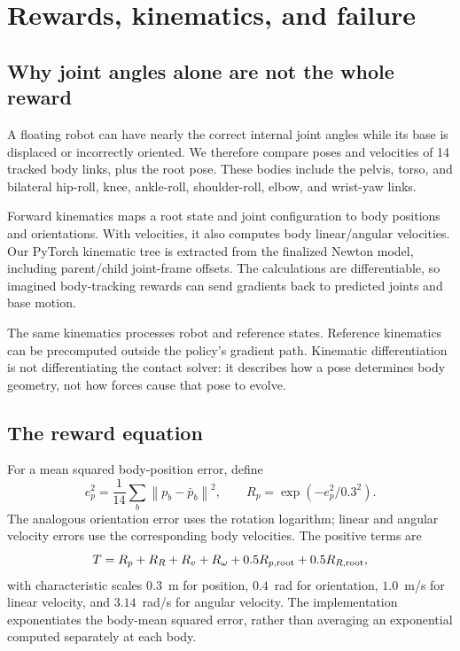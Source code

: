 \documentclass[11pt,a4paper]{article}
\newcommand{\norm}[1]{\left\lVert #1\right\rVert}
\begin{document}
\section{Rewards, kinematics, and failure}\label{sec:rewards}
\subsection{Why joint angles alone are not the whole reward}
A floating robot can have nearly the correct internal joint angles while its
base is displaced or incorrectly oriented. We therefore compare poses and
velocities of 14 tracked body links, plus the root pose. These bodies include
the pelvis, torso, and bilateral hip-roll, knee, ankle-roll, shoulder-roll,
elbow, and wrist-yaw links.

Forward kinematics maps a root state and joint configuration to body positions
and orientations. With velocities, it also computes body linear/angular
velocities. Our PyTorch kinematic tree is extracted from the finalized Newton
model, including parent/child joint-frame offsets. The calculations are
differentiable, so imagined body-tracking rewards can send gradients back to
predicted joints and base motion.

The same kinematics processes robot and reference states. Reference kinematics
can be precomputed outside the policy's gradient path. Kinematic differentiation
is not differentiating the contact solver: it describes how a pose determines
body geometry, not how forces cause that pose to evolve.

\subsection{The reward equation}
For a mean squared body-position error, define
\begin{equation}
e_p^2=\frac{1}{14}\sum_b\norm{p_b-\bar p_b}^2,
\qquad R_p=\exp(-e_p^2/0.3^2).
\end{equation}
The analogous orientation error uses the rotation logarithm; linear and angular
velocity errors use the corresponding body velocities. The positive terms are
\begin{equation}
T=R_p+R_R+R_v+R_\omega+0.5R_{p,\rm root}+0.5R_{R,\rm root},
\end{equation}
with characteristic scales $0.3$~m for position, $0.4$~rad for orientation,
$1.0$~m/s for linear velocity, and $3.14$~rad/s for angular velocity. The
implementation exponentiates the body-mean squared error, rather than averaging
an exponential computed separately at each body.
\end{document}
